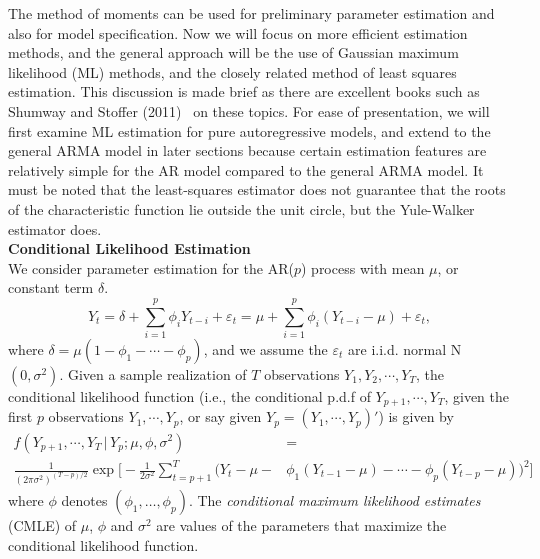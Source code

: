 The method of moments can be used for preliminary parameter estimation and also for model specification. Now we will focus on more efficient estimation methods, and the general approach will be the use of Gaussian maximum likelihood (ML) methods, and the closely related method of least squares estimation. This discussion is made brief as there are excellent books such as Shumway and Stoffer (2011)~\cite{shumway2011arima} on these topics. For ease of presentation, we will first examine ML estimation for pure autoregressive models, and extend to the general ARMA model in later sections because certain estimation features are relatively simple for the AR model compared to the general ARMA model. It must be noted that the least-squares estimator does not guarantee that the roots of the characteristic function lie outside the unit circle, but the Yule-Walker estimator does. \\


\noindent\textbf{Conditional Likelihood Estimation} \\


We consider parameter estimation for the AR($p$) process with mean $\mu$, or constant term $\delta$.
	\begin{equation}\label{eqn:ytseqagain}
	Y_t = \delta + \sum_{i=1}^p\phi_iY_{t-i} + \varepsilon_t= \mu + \sum_{i=1}^p\phi_i(Y_{t-i} - \mu) + \varepsilon_t,
	\end{equation}
where $\delta = \mu(1 - \phi_1 - \cdots - \phi_p)$, and we assume the $\varepsilon_t$ are i.i.d. normal N$(0,\sigma^2)$. Given a sample realization of $T$ observations $Y_1,Y_2,\cdots,Y_T$, the conditional likelihood function (i.e., the conditional p.d.f of $Y_{p+1},\cdots,Y_T$, given the first $p$ observations $Y_1,\cdots,Y_p$, or say given $Y_p = (Y_1,\cdots,Y_p)'$) is given by
	\[
	\begin{split}
	f(Y_{p+1},\cdots,Y_T \,|\, Y_p;\mu,\phi,\sigma^2)&=\\ 
	\frac{1}{(2\pi\sigma^2)^{(T-p)/2}} \exp\bigg[-\frac{1}{2\sigma^2}\sum_{t=p+1}^T \big(Y_t - \mu - &\phi_1(Y_{t-1} - \mu) - \cdots  - \phi_p(Y_{t-p} - \mu) \big)^2 \bigg] 
	\end{split}
	\]
where $\phi$ denotes $(\phi_1,\ldots,\phi_p)$. The \textit{conditional maximum likelihood estimates} (CMLE) of $\mu$, $\phi$ and $\sigma^2$ are values of the parameters that maximize the conditional likelihood function.


